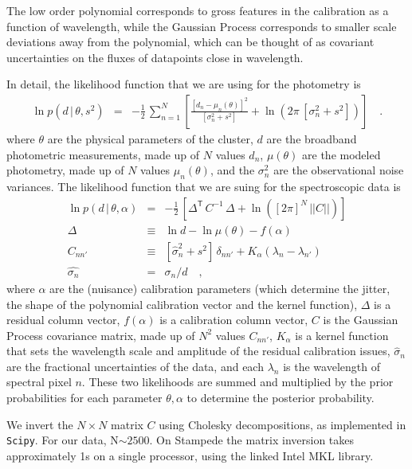 \documentclass[11pt,preprint]{aastex}
\newcommand{\transpose}[1]{{#1}^{\!\mathsf T}}
\newcommand{\given}{\,|\,}
\renewcommand{\det}[1]{||{#1}||}
\begin{document}
The low order polynomial corresponds to gross features in the calibration as a function of wavelength, while the Gaussian Process corresponds to smaller scale deviations away from the polynomial, which can be thought of as covariant uncertainties on the fluxes of datapoints close in wavelength.

In detail, the likelihood function that we are using for the photometry is 
\begin{eqnarray}\label{eq:photometricLF}
\ln p(d\given\theta,s^2) &=& -\frac{1}{2}\,\sum_{n=1}^N \left[\frac{[d_n - \mu_n(\theta)]^2}{[\sigma_n^2 + s^2]} + \ln(2\pi\,[\sigma_n^2 + s^2]) \right]
\quad .
\end{eqnarray}
where $\theta$ are the physical parameters of the cluster,
$d$ are the broadband photometric measurements,
made up of $N$ values $d_n$,
$\mu(\theta)$ are the modeled photometry,
made up of $N$ values $\mu_n(\theta)$, and
the $\sigma_n^2$ are the observational noise variances.
The likelihood function that we are suing for the spectroscopic data is 
\begin{eqnarray}\label{eq:spectroscopicLF}
\ln p(d\given\theta,\alpha) &=& -\frac{1}{2}\,\left[\transpose{\Delta}\,C^{-1}\,\Delta + \ln([2\pi]^N\,\det{C}) \right]
\\
\Delta &\equiv& \ln d - \ln \mu(\theta) - f(\alpha) 
\\
C_{nn'} &\equiv& [\hat{\sigma}_n^2 + s^2]\,\delta_{nn'} +
K_\alpha(\lambda_n - \lambda_{n'})
\\
\hat{\sigma_n} & = &\sigma_n/d
\quad ,
\end{eqnarray}
where $\alpha$ are the (nuisance) calibration parameters
(which determine the jitter, the shape of the polynomial calibration vector and the kernel function),
$\Delta$ is a residual column vector,
$f(\alpha)$ is a calibration column vector,
$C$ is the Gaussian Process covariance matrix,
made up of $N^2$ values $C_{nn'}$,
$K_\alpha$ is a kernel function that sets the wavelength scale and
amplitude of the residual calibration issues,
$\hat{\sigma}_n$ are the fractional uncertainties of the data,
and each $\lambda_n$ is the wavelength of spectral pixel $n$.
These two likelihoods are summed and multiplied by the prior probabilities for each parameter ${\theta, \alpha}$ to determine the posterior probability.

We invert the $N \times N$ matrix $C$ using Cholesky decompositions, as implemented in \texttt{Scipy}. 
For our data, N$\sim 2500$.  
On Stampede the matrix inversion takes approximately 1s on a single processor, using the linked Intel MKL library.
\end{document}
